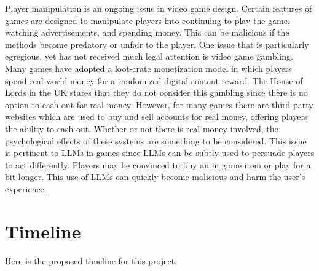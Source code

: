 \documentclass[10pt,twocolumn]{article}
\begin{document}
        \par
        Player manipulation is an ongoing issue in video game design. Certain features of games are designed to manipulate players into continuing to play the game, watching advertisements, and spending money. This can be malicious if the methods become predatory or unfair to the player. One issue that is particularly egregious, yet has not received much legal attention is video game gambling. Many games have adopted a loot-crate monetization model in which players spend real world money for a randomized digital content reward. The House of Lords in the UK states that they do not consider this gambling since there is no option to cash out for real money\cite{loot_boxes}. However, for many games there are third party websites which are used to buy and sell accounts for real money, offering players the ability to cash out. Whether or not there is real money involved, the psychological effects of these systems are something to be considered. This issue is pertinent to LLMs in games since LLMs can be subtly used to persuade players to act differently. Players may be convinced to buy an in game item or play for a bit longer. This use of LLMs can quickly become malicious and harm the user's experience.

\section{Timeline}

    \par 
    Here is the proposed timeline for this project: \newline 
    
\end{document}
